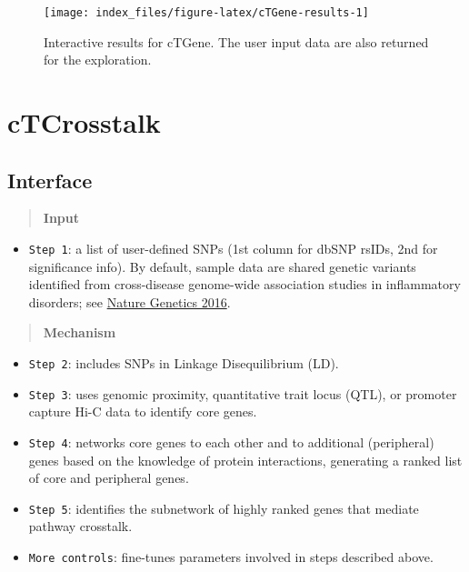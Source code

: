 \documentclass[
  oneside]{book}
\providecommand{\tightlist}{%
  \setlength{\itemsep}{0pt}\setlength{\parskip}{0pt}}
\begin{document}
\begin{figure}

{\centering \texttt{[image: index\_files/figure-latex/cTGene-results-1]} 

}

\caption{Interactive results for cTGene. The user input data are also returned for the exploration.}\label{fig:cTGene-results}
\end{figure}

\hypertarget{ctcrosstalk}{%
\chapter{cTCrosstalk}\label{ctcrosstalk}}

\hypertarget{interface-4}{%
\section{Interface}\label{interface-4}}

\begin{quote}
\textbf{Input}
\end{quote}

\begin{itemize}
\tightlist
\item
  \texttt{Step\ 1}: a list of user-defined SNPs (1st column for dbSNP rsIDs, 2nd for significance info). By default, sample data are shared genetic variants identified from cross-disease genome-wide association studies in inflammatory disorders; see \href{https://www.ncbi.nlm.nih.gov/pubmed/26974007}{Nature Genetics 2016}.
\end{itemize}

\begin{quote}
\textbf{Mechanism}
\end{quote}

\begin{itemize}
\item
  \texttt{Step\ 2}: includes SNPs in Linkage Disequilibrium (LD).
\item
  \texttt{Step\ 3}: uses genomic proximity, quantitative trait locus (QTL), or promoter capture Hi-C data to identify core genes.
\item
  \texttt{Step\ 4}: networks core genes to each other and to additional (peripheral) genes based on the knowledge of protein interactions, generating a ranked list of core and peripheral genes.
\item
  \texttt{Step\ 5}: identifies the subnetwork of highly ranked genes that mediate pathway crosstalk.
\item
  \texttt{More\ controls}: fine-tunes parameters involved in steps described above.
\end{itemize}
\end{document}
